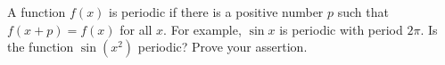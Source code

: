A function $ f(x)$ is periodic if there is a positive number $ p$ such that $ f(x+p) = f(x)$ for all $ x$. For example, $ \sin x$ is periodic with period $ 2 \pi$. Is the function $ \sin(x^2)$ periodic? Prove your assertion.